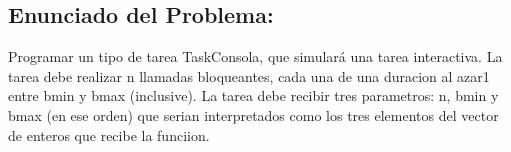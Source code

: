 \subsection{Enunciado del Problema:}
Programar un tipo de tarea TaskConsola, que simular\'a una tarea interactiva. La tarea debe realizar n llamadas bloqueantes, cada una de una duracion al azar1 entre bmin y bmax (inclusive). La tarea debe recibir tres parametros: n, bmin y bmax (en ese orden) que serian interpretados como los tres elementos del vector de enteros que recibe la funciion.
